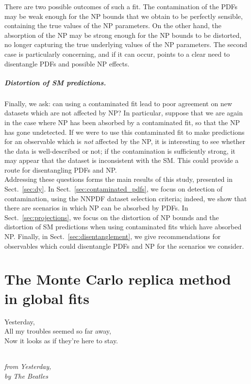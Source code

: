 \documentclass[withindex,glossary]{cam-thesis}
\begin{document}
There are two possible outcomes of such a fit. The contamination of the PDFs may be weak enough for the NP bounds that we obtain to be perfectly sensible, containing the true values of the NP parameters. On the other hand, the absorption of the NP may be strong enough for the NP bounds to be distorted, no longer capturing the true underlying values of the NP parameters. The second case is particularly concerning, and if it can occur, points to a clear need to disentangle PDFs and possible NP effects.

\paragraph{Distortion of SM predictions.} Finally, we ask: can using a contaminated fit lead to poor agreement on new datasets which are not affected by NP? In particular, suppose that we are again in the case where NP has been absorbed by a contaminated fit, so that the NP has gone undetected. If we were to use this contaminated fit to make predictions for an observable which is \textit{not} affected by the NP, it is interesting to see whether the data is well-described or not; if the contamination is sufficiently strong, it may appear that the dataset is inconsistent with the SM. This could provide a route for disentangling PDFs and NP.\\

\noindent Addressing these questions forms the main results of this study, presented in Sect.~\ref{sec:dy}. In Sect.~\ref{sec:contaminated_pdfs}, we focus on detection of contamination, using the NNPDF dataset selection criteria; indeed, we show that there are scenarios in which NP can be absorbed by PDFs. In Sect.~\ref{sec:projections}, we focus on the distortion of NP bounds and the distortion of SM predictions when using contaminated fits which have absorbed NP. Finally, in Sect.~\ref{sec:disentanglement}, we give recommendations for observables which could disentangle PDFs and NP for the scenarios we consider.




\newpage
\chapter{The Monte Carlo replica method in global fits}
\label{chap:montecarlo}

\epigraph{Yesterday, \\ All my troubles seemed so far away, \\ Now it looks as if they're here to stay.}{\textit{\\ from Yesterday, \\ by The Beatles}}
\end{document}
